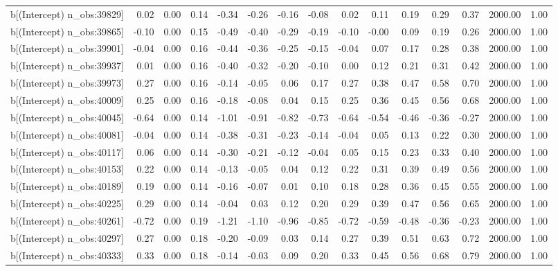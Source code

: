 \begin{table}[ht]
\begin{tabular}{rrrrrrrrrrrrrrr}
  b[(Intercept) n\_obs:39829] & 0.02 & 0.00 & 0.14 & -0.34 & -0.26 & -0.16 & -0.08 & 0.02 & 0.11 & 0.19 & 0.29 & 0.37 & 2000.00 & 1.00 \\ 
  b[(Intercept) n\_obs:39865] & -0.10 & 0.00 & 0.15 & -0.49 & -0.40 & -0.29 & -0.19 & -0.10 & -0.00 & 0.09 & 0.19 & 0.26 & 2000.00 & 1.00 \\ 
  b[(Intercept) n\_obs:39901] & -0.04 & 0.00 & 0.16 & -0.44 & -0.36 & -0.25 & -0.15 & -0.04 & 0.07 & 0.17 & 0.28 & 0.38 & 2000.00 & 1.00 \\ 
  b[(Intercept) n\_obs:39937] & 0.01 & 0.00 & 0.16 & -0.40 & -0.32 & -0.20 & -0.10 & 0.00 & 0.12 & 0.21 & 0.31 & 0.42 & 2000.00 & 1.00 \\ 
  b[(Intercept) n\_obs:39973] & 0.27 & 0.00 & 0.16 & -0.14 & -0.05 & 0.06 & 0.17 & 0.27 & 0.38 & 0.47 & 0.58 & 0.70 & 2000.00 & 1.00 \\ 
  b[(Intercept) n\_obs:40009] & 0.25 & 0.00 & 0.16 & -0.18 & -0.08 & 0.04 & 0.15 & 0.25 & 0.36 & 0.45 & 0.56 & 0.68 & 2000.00 & 1.00 \\ 
  b[(Intercept) n\_obs:40045] & -0.64 & 0.00 & 0.14 & -1.01 & -0.91 & -0.82 & -0.73 & -0.64 & -0.54 & -0.46 & -0.36 & -0.27 & 2000.00 & 1.00 \\ 
  b[(Intercept) n\_obs:40081] & -0.04 & 0.00 & 0.14 & -0.38 & -0.31 & -0.23 & -0.14 & -0.04 & 0.05 & 0.13 & 0.22 & 0.30 & 2000.00 & 1.00 \\ 
  b[(Intercept) n\_obs:40117] & 0.06 & 0.00 & 0.14 & -0.30 & -0.21 & -0.12 & -0.04 & 0.05 & 0.15 & 0.23 & 0.33 & 0.40 & 2000.00 & 1.00 \\ 
  b[(Intercept) n\_obs:40153] & 0.22 & 0.00 & 0.14 & -0.13 & -0.05 & 0.04 & 0.12 & 0.22 & 0.31 & 0.39 & 0.49 & 0.56 & 2000.00 & 1.00 \\ 
  b[(Intercept) n\_obs:40189] & 0.19 & 0.00 & 0.14 & -0.16 & -0.07 & 0.01 & 0.10 & 0.18 & 0.28 & 0.36 & 0.45 & 0.55 & 2000.00 & 1.00 \\ 
  b[(Intercept) n\_obs:40225] & 0.29 & 0.00 & 0.14 & -0.04 & 0.03 & 0.12 & 0.20 & 0.29 & 0.39 & 0.47 & 0.56 & 0.65 & 2000.00 & 1.00 \\ 
  b[(Intercept) n\_obs:40261] & -0.72 & 0.00 & 0.19 & -1.21 & -1.10 & -0.96 & -0.85 & -0.72 & -0.59 & -0.48 & -0.36 & -0.23 & 2000.00 & 1.00 \\ 
  b[(Intercept) n\_obs:40297] & 0.27 & 0.00 & 0.18 & -0.20 & -0.09 & 0.03 & 0.14 & 0.27 & 0.39 & 0.51 & 0.63 & 0.72 & 2000.00 & 1.00 \\ 
  b[(Intercept) n\_obs:40333] & 0.33 & 0.00 & 0.18 & -0.14 & -0.03 & 0.09 & 0.20 & 0.33 & 0.45 & 0.56 & 0.68 & 0.79 & 2000.00 & 1.00 \\ 

\end{tabular}
\end{table}
